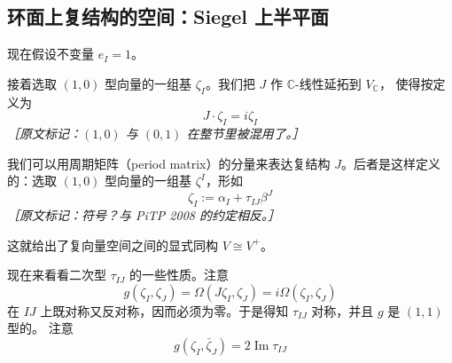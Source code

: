 \subsection{环面上复结构的空间：Siegel 上半平面} %

现在假设不变量 $e_I=1$。

接着选取 $(1,0)$ 型向量的一组基 $\zeta_I$。我们把 $J$ 作 $\mathbb{C}$-线性延拓到 $V_{\mathbb{C}}$，
使得按定义为
\begin{equation}
  J\cdot\zeta_I = i\zeta_I
  \tag{E.23}
  \label{eq:E.23}
\end{equation}
{\small\itshape ［原文标记：$(1,0)$ 与 $(0,1)$ 在整节里被混用了。］}

我们可以用周期矩阵（period matrix）的分量来表达复结构 $J$。后者是这样定义的：选取 $(1,0)$ 型向量的一组基
$\zeta^I$，形如
\begin{equation}
  \zeta_I := \alpha_I+\tau_{IJ}\beta^J
  \tag{E.24}
  \label{eq:E.24}
\end{equation}
{\small\itshape ［原文标记：符号？与 PiTP 2008 的约定相反。］}

这就给出了复向量空间之间的显式同构 $V\cong V^+$。

现在来看看二次型 $\tau_{IJ}$ 的一些性质。注意
\begin{equation}
  g(\zeta_I,\zeta_J) = \Omega(J\zeta_I,\zeta_J) = i\Omega(\zeta_I,\zeta_J)
  \tag{E.25}
  \label{eq:E.25}
\end{equation}
在 $IJ$ 上既对称又反对称，因而必须为零。于是得知 $\tau_{IJ}$ 对称，并且 $g$ 是 $(1,1)$ 型的。
注意
\begin{equation}
  g(\zeta_I,\bar\zeta_J) = 2\operatorname{Im}\tau_{IJ}
  \tag{E.26}
  \label{eq:E.26}
\end{equation}


